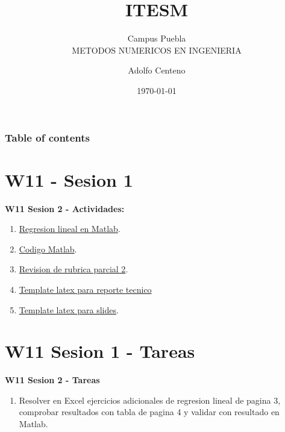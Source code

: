 \documentclass{beamer}
\begin{document}
\title{ITESM}  
\subtitle{Campus Puebla\\METODOS NUMERICOS EN INGENIERIA
}
\author{Adolfo Centeno}
\date{\today} 


\begin{frame}
\titlepage
\end{frame}

\begin{frame}\frametitle{Table of contents}
\tableofcontents
\end{frame} 


\section{W11 - Sesion 1 }

\begin{frame}

\textbf{W11 Sesion 2 - Actividades:}

\begin{enumerate}
\item
	 \href{https://la.mathworks.com/help/matlab/data_analysis/linear-regression.html?lang=en}{Regresion lineal en Matlab}.

\item
	 \href{https://github.com/adsoftsito/metodos-numericos/tree/master/w11/reglineal}{Codigo Matlab}.

\item
	 \href{https://github.com/adsoftsito/metodos-numericos/blob/master/parcial2/rubricaParcial2.pdf}{Revision de rubrica parcial 2}.

\item
	 \href{https://github.com/adsoftsito/metodos-numericos/blob/master/parcial2/latexReporteRecnico.tex}{Template latex para reporte tecnico}

\item
	 \href{https://github.com/adsoftsito/metodos-numericos/blob/master/parcial2/latexSlides.tex}{Template latex para slides}.

\end{enumerate} 

\end{frame}


\section{W11 Sesion 1 - Tareas }

\begin{frame}


\textbf{W11 Sesion 2 - Tareas}


\begin{enumerate}
\item

Resolver en Excel ejercicios adicionales de regresion lineal de pagina 3, comprobar resultados con tabla de pagina 4 y
validar con resultado en Matlab.


\end{enumerate} 


\end{frame}
\end{document}
